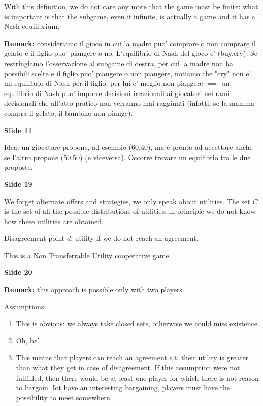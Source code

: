 \noindent With this definition, we do not care any more that the game must be 
finite: what is important is that the subgame, even if infinite, is actually 
a game and it has a Nash equilibrium.

\noindent \textbf{Remark:} consideriamo il gioco in cui la madre puo' comprare o 
non comprare il gelato e il figlio puo' piangere o no. L'equilibrio di Nash del 
gioco e' (buy,cry). Se restringiamo l'osservazione al subgame di destra, per 
cui la madre non ha possibili scelte e il figlio puo' piangere o non piangere, 
notiamo che "cry" non e' un equilibrio di Nash per il figlio: per lui e' meglio 
non piangere $\implies$ un equilibrio di Nash puo' imporre decisioni irrazionali 
ai giocatori nei rami decisionali che all'atto pratico non verranno mai 
raggiunti (infatti, se la mamma compra il gelato, il bambino non piange).

\bigskip
\noindent \textbf{Slide 11}

\noindent Idea: un giocatore propone, ad esempio (60,40), ma è pronto ad 
accettare anche se l'altro propone (50,50) (e viceversa). Occorre trovare 
un equilibrio tra le due proposte. 

\bigskip
\noindent \textbf{Slide 19}

\noindent We forget alternate offers and strategies, we only speak about 
utilities. The set $C$ is the set of all the possible distributions of utilities; 
in principle we do not know how these utilities are obtained.

\noindent Disagreement point $d$: utility if we do not reach an agreement.

\noindent This is a Non Transferrable Utility cooperative game.

\bigskip
\noindent \textbf{Slide 20}

\noindent \textbf{Remark:} this approach is possible only with two players.

\noindent Assumptions:
\begin{enumerate}
	\item This is obvious: we always take closed sets, otherwise we could 
	miss existence.
	\item Oh, be'
	\item This means that players can reach an agreement s.t. their utility 
	is greater than what they get in case of disagreement. If this assumption 
	were not fullfilled, then there would be at least one player for which 
	there is not reason to bargain. Iot have an interesting bargaining, 
	players must have the possibility to meet somewhere.
\end{enumerate}

%
